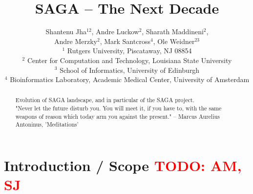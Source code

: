 \documentclass{article}
\newcommand{\B}[1]{\textbf{#1}}
\newcommand{\todo}[1]{{\textcolor{red}{\B{TODO:} #1 }}}
\begin{document}
\title{\large SAGA -- The Next Decade}

\author{
        Shantenu Jha$^{12}$,
        Andre Luckow$^{2}$,
        Sharath Maddineni$^{2}$,\\
        Andre Merzky$^{2}$,
        Mark Santcross$^{4}$,
        Ole Weidner$^{23}$
        \\[1em]
        $^1$\small
         Rutgers University, 
         Piscataway, NJ 08854\\[-0.3em]
        $^2$ \small
          Center for Computation and Technology, 
          Louisiana State University\\[-0.3em]
        $^3$ \small
          School of Informatics, 
          University of Edinburgh \\[-0.3em]  
        $^4$ \small
         Bioinformatics Laboratory, Academic Medical Center, 
         University of Amsterdam\\[-0.3em]
       }

\maketitle

\begin{abstract}
 Evolution of SAGA landscape, and in particular of the SAGA project.\\

 "Never let the future disturb you. You will meet it, if you have to, 
  with the same weapons of reason which today arm you against the present."
  -- Marcus Aurelius Antoninus, 'Meditations'\\
\end{abstract}

\section{Introduction / Scope \todo{AM, SJ}}
\end{document}

